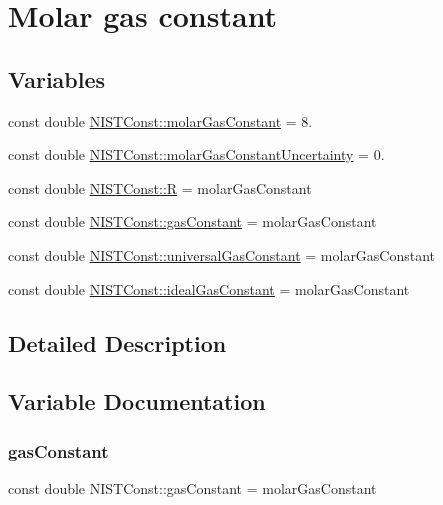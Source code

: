 \hypertarget{group___molar_gas_constant}{}\section{Molar gas constant}
\label{group___molar_gas_constant}
\subsection*{Variables}
\begin{DoxyCompactItemize}
\item 
const double \hyperlink{group___molar_gas_constant_ga923e5cda42e8fec4a70640b82051d309}{N\+I\+S\+T\+Const\+::molar\+Gas\+Constant} = 8.
\item 
const double \hyperlink{group___molar_gas_constant_ga0b24ac606a3ba6a685599a78586fbc77}{N\+I\+S\+T\+Const\+::molar\+Gas\+Constant\+Uncertainty} = 0.
\item 
const double \hyperlink{group___molar_gas_constant_gaa556f6ded49d1e2f9d5059fdd382bfd4}{N\+I\+S\+T\+Const\+::R} = molar\+Gas\+Constant
\item 
const double \hyperlink{group___molar_gas_constant_ga8a80485a1bf8e9acded5ddd69a05084f}{N\+I\+S\+T\+Const\+::gas\+Constant} = molar\+Gas\+Constant
\item 
const double \hyperlink{group___molar_gas_constant_ga081ff52b90c1476a7c7e55dcee67fa8e}{N\+I\+S\+T\+Const\+::universal\+Gas\+Constant} = molar\+Gas\+Constant
\item 
const double \hyperlink{group___molar_gas_constant_ga0315ba6edc63c93914224443ef8a6e17}{N\+I\+S\+T\+Const\+::ideal\+Gas\+Constant} = molar\+Gas\+Constant
\end{DoxyCompactItemize}


\subsection{Detailed Description}


\subsection{Variable Documentation}
\mbox{\label{group___molar_gas_constant_ga8a80485a1bf8e9acded5ddd69a05084f}} 
\subsubsection{\texorpdfstring{gas\+Constant}{gasConstant}}
{\footnotesize\ttfamily const double N\+I\+S\+T\+Const\+::gas\+Constant = molar\+Gas\+Constant}


